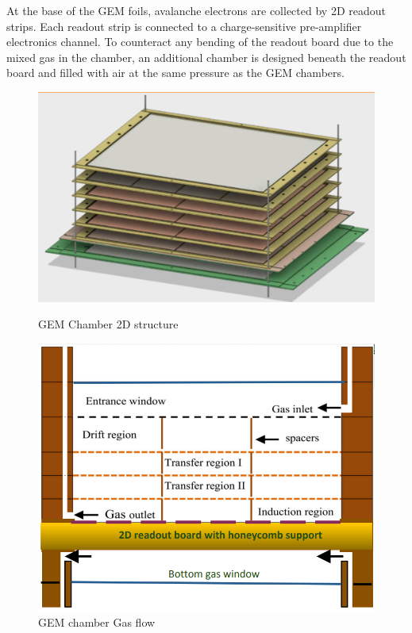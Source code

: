 At the base of the GEM foils, avalanche electrons are collected by 2D readout strips. Each readout strip is connected to a charge-sensitive pre-amplifier electronics channel. To counteract any bending of the readout board due to the mixed gas in the chamber, an additional chamber is designed beneath the readout board and filled with air at the same pressure as the GEM chambers.


\begin{figure}[!tbp]
  \centering
  \begin{minipage}[b]{0.45\textwidth}
    \includegraphics[width=\textwidth]{images/chap5/gem_structure_3d.png}
    \caption{GEM Chamber 2D structure}
  \end{minipage}
  \hfill
  \begin{minipage}[b]{0.45\textwidth}
    \includegraphics[width=\textwidth]{images/chap5/gem_structure_chamber_2d.png}
    \caption{GEM chamber Gas flow}
  \end{minipage}
\end{figure}


